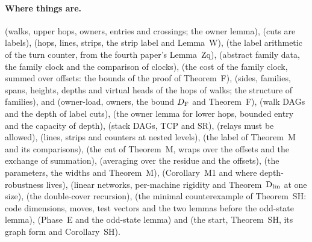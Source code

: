 \paragraph{Where things are.}  (walks, upper hops, owners, entries and crossings; the owner lemma),
 (cuts are labels),  (hops, lines, strips, the strip label and Lemma~W),
 (the label arithmetic of the turn counter, from the fourth paper's Lemma~Zq),
 (abstract family data, the family clock and the comparison of clocks),  (the
cost of the family clock, summed over offsets: the bounds of the proof of Theorem~F),  (sides,
families, spans, heights, depths and virtual heads of the hops of walks; the structure of families), and
 (owner-load, owners, the bound $D_{\mathrm F}$ and Theorem~F),  (walk DAGs and
the depth of label cuts),  (the owner lemma for lower hops, bounded entry and the capacity of depth),
 (stack DAGs, TCP and SR),  (relays must be allowed),
 (lines, strips and counters at nested levels),  (the label of Theorem~M and its
comparisons),  (the cut of Theorem~M, wraps over the offsets and the exchange of summation),
 (averaging over the residue and the offsets),  (the parameters, the widths and
Theorem~M),  (Corollary~M1 and where depth-robustness lives),  (linear networks,
per-machine rigidity and Theorem~$\mathrm{D}_{\mathrm{lin}}$ at one size),  (the double-cover recursion),
 (the minimal counterexample of Theorem~SH: code dimensions, moves, test vectors and the two lemmas
before the odd-state lemma),  (Phase~E and the odd-state lemma) and  (the start,
Theorem~SH, its graph form and Corollary~SH).
